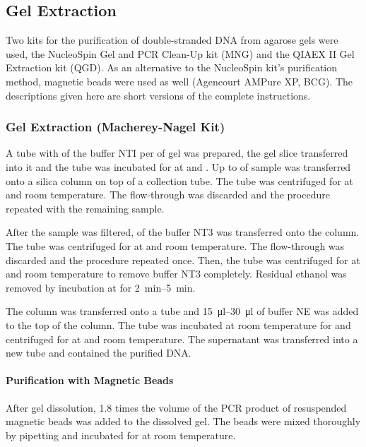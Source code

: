 \subsection{Gel Extraction\label{subsec-gel-ex}}
Two kits for the purification of double-stranded DNA from agarose gels were used, the NucleoSpin Gel and PCR Clean-Up kit (MNG) and the QIAEX II Gel Extraction kit (QGD). As an alternative to the NucleoSpin kit's purification method, magnetic beads were used as well (Agencourt AMPure XP, BCG). The descriptions given here are short versions of the complete instructions.

\subsubsection{Gel Extraction (Macherey-Nagel Kit)\label{subsubsec-gel-ex-macherey-nagel}}
A tube with  of the buffer NTI per  of gel was prepared, the gel slice transferred into it and the tube was incubated for  at  and . Up to  of sample was transferred onto a silica column on top of a collection tube. The tube was centrifuged for  at  and room temperature. The flow-through was discarded and the procedure repeated with the remaining sample.

After the sample was filtered,  of the buffer NT3 was transferred onto the column. The tube was centrifuged for  at  and room temperature. The flow-through was discarded and the procedure repeated once. Then, the tube was centrifuged for  at  and room temperature to remove buffer NT3 completely. Residual ethanol was removed by incubation at  for \SIrange{2}{5}{\minute}.

The column was transferred onto a  tube and \SIrange{15}{30}{\micro\litre} of buffer NE was added to the top of the column. The tube was incubated at room temperature for  and centrifuged for  at  and room temperature. The supernatant was transferred into a new tube and contained the purified DNA.

\paragraph{Purification with Magnetic Beads\label{subsubsec-gel-ex-magnetic-beads}}
After gel dissolution, \num{1.8} times the volume of the PCR product of resuspended magnetic beads was added to the dissolved gel. The beads were mixed thoroughly by pipetting and incubated for  at room temperature.

